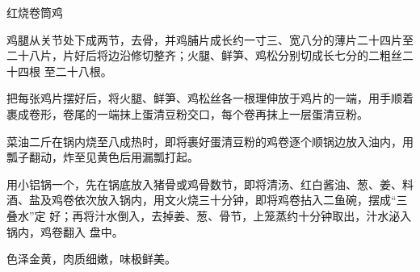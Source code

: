 %
%
%
%
%
%
%
\begin{recipe}{红烧卷筒鸡}

\ingredients


\preparation

\step 鸡腿从关节处下成两节，去骨，并鸡脯片成长约一寸三、宽八分的薄片二十四片至
二十八片，片好后将边沿修切整齐；火腿、鲜笋、鸡松分别切成长七分的二粗丝二十四根
至二十八根。

\step 把每张鸡片摆好后，将火腿、鲜笋、鸡松丝各一根理伸放于鸡片的一端，用手顺着
裹成卷形，卷尾的一端抹上蛋清豆粉交口，每个卷再抹上一层蛋清豆粉。

\step 菜油二斤在锅内烧至八成热时，即将裹好蛋清豆粉的鸡卷逐个顺锅边放入油内，用
瓢子翻动，炸至见黄色后用漏瓢打起。

\step 用小铝锅一个，先在锅底放入猪骨或鸡骨数节，即将清汤、红白酱油、葱、姜、料
酒、盐及鸡卷依次放入锅内，用文火烧三十分钟，即将鸡卷拈入二鱼碗，摆成“三叠水”定
好；再将汁水倒入，去掉姜、葱、骨节，上笼蒸约十分钟取出，汁水泌入锅内，鸡卷翻入
盘中。

\features

色泽金黄，肉质细嫩，味极鲜美。

\end{recipe}

